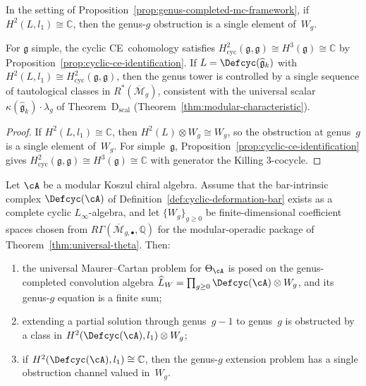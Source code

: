 \begin{corollary}\label{cor:one-dim-obstruction}
In the setting of
Proposition~\textup{\ref{prop:genus-completed-mc-framework}},
if $H^2(L, l_1) \cong \mathbb{C}$, then the genus-$g$
obstruction is a single element of~$W_g$.

For $\mathfrak{g}$ simple, the cyclic
CE~cohomology satisfies
$H^2_{\mathrm{cyc}}(\mathfrak{g}, \mathfrak{g})
\cong H^3(\mathfrak{g}) \cong \mathbb{C}$
by Proposition~\textup{\ref{prop:cyclic-ce-identification}}.
If $L = \Defcyc(\widehat{\mathfrak{g}}_k)$ with
$H^2(L, l_1) \cong H^2_{\mathrm{cyc}}(\mathfrak{g},
\mathfrak{g})$, then the genus tower is controlled by a
single sequence of tautological classes in
$R^*(\overline{\mathcal{M}}_g)$, consistent with the
universal scalar
$\kappa(\widehat{\mathfrak{g}}_k) \cdot \lambda_g$
of Theorem~D$_{\mathrm{scal}}$
(\textup{Theorem~\ref{thm:modular-characteristic}}).
\end{corollary}

\begin{proof}
If $H^2(L, l_1) \cong \mathbb{C}$, then
$H^2(L) \otimes W_g \cong W_g$, so the obstruction at
genus~$g$ is a single element of~$W_g$.
For simple~$\mathfrak{g}$,
Proposition~\ref{prop:cyclic-ce-identification} gives
$H^2_{\mathrm{cyc}}(\mathfrak{g}, \mathfrak{g}) \cong
H^3(\mathfrak{g}) \cong \mathbb{C}$ with generator the
Killing $3$-cocycle.
\end{proof}

\begin{proposition}\label{prop:mc2-reduction-principle}
Let $\cA$ be a modular Koszul chiral algebra.  Assume that the
bar-intrinsic complex $\Defcyc(\cA)$ of
Definition~\ref{def:cyclic-deformation-bar} exists as a complete cyclic
$L_\infty$-algebra, and let $\{W_g\}_{g \geq 0}$ be finite-dimensional
coefficient spaces chosen from
$R\Gamma(\overline{\mathcal{M}}_{g,\bullet}, \mathbb{Q})$ for the
modular-operadic package of
Theorem~\ref{thm:universal-theta}.  Then:
\begin{enumerate}[label=\textup{(\roman*)}]
\item the universal Maurer--Cartan problem for $\Theta_{\cA}$ is posed
  on the genus-completed convolution algebra
  $\widehat{L}_W = \prod_{g \geq 0}\Defcyc(\cA)\otimes W_g$, and its
  genus-$g$ equation is a finite sum;
\item extending a partial solution through genus~$g-1$ to genus~$g$ is
  obstructed by a class in
  $H^2(\Defcyc(\cA), l_1) \otimes W_g$;
\item if $H^2(\Defcyc(\cA), l_1) \cong \mathbb{C}$, then the
  genus-$g$ extension problem has a single obstruction channel valued
  in~$W_g$.
\end{enumerate}
\end{proposition}

